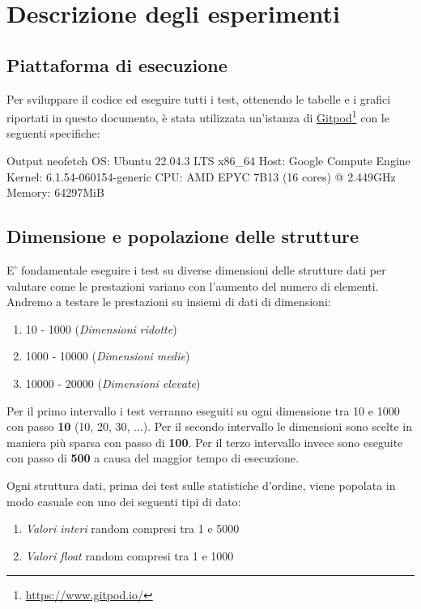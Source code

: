 \documentclass[onecolumn]{article}
\newcommand\anchor[2]{%
  \href{#2}{#1}\footnote{\url{#2}}%
}
\begin{document}
\section{Descrizione degli esperimenti}
\subsection{Piattaforma di esecuzione}

Per sviluppare il codice ed eseguire tutti i test, ottenendo le tabelle e i grafici riportati in questo documento, è stata utilizzata un'istanza di \anchor{Gitpod}{https://www.gitpod.io/} con le seguenti specifiche:
\begin{bashCode}{Output neofetch}
	OS: Ubuntu 22.04.3 LTS x86_64 
	Host: Google Compute Engine 
	Kernel: 6.1.54-060154-generic 
	CPU: AMD EPYC 7B13 (16 cores) @ 2.449GHz 
	Memory: 64297MiB
\end{bashCode}

\subsection{Dimensione e popolazione delle strutture}

E' fondamentale eseguire i test su diverse dimensioni delle strutture dati per valutare come le prestazioni variano con l'aumento del numero di elementi. Andremo a testare le prestazioni su insiemi di dati di dimensioni:
\begin{enumerate}
	\setlength\itemsep{-0.25em}
	\item 10 - 1000 (\textit{Dimensioni ridotte})
	\item 1000 - 10000 (\textit{Dimensioni medie})
	\item 10000 - 20000 (\textit{Dimensioni elevate})
\end{enumerate}

Per il primo intervallo i test verranno eseguiti su ogni dimensione tra 10 e 1000 con passo \textbf{10} (10, 20, 30, ...). Per il secondo intervallo le dimensioni sono scelte in maniera più sparsa con passo di \textbf{100}. Per il terzo intervallo invece sono eseguite con passo di \textbf{500} a causa del maggior tempo di esecuzione. \vspace{1em}

Ogni struttura dati, prima dei test sulle statistiche d'ordine, viene popolata in modo casuale con uno dei seguenti tipi di dato:
\begin{enumerate}
	\setlength\itemsep{-0.25em}
	\item \textit{Valori interi} random compresi tra 1 e 5000
	\item \textit{Valori float} random compresi tra 1 e 1000
\end{enumerate}
\end{document}
